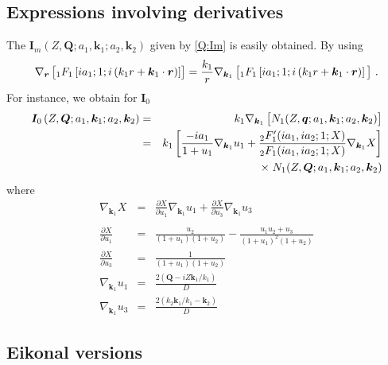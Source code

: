 \subsection{Expressions involving derivatives}
The $\bm{I}_{m} \left(Z, \bm{Q}; a_{1}, \bm{k}_{1} ; a_{2}, \bm{k}_{2}
\right) $ given by \ref{Q:Im} is easily obtained. By using
%
\[
\nabla_{\bm{r}} \left[\vstretch {_{1}F_{1}} \left[ i a_{1} ; 1 ;i
\left(k_{1} r + \bm{k}_{1}\cdot \bm{r} \right)\right] \right] =
\frac{k_{1}}{r} \nabla_{\bm{k}_{1}}\left[  {_{1}F_{1}} \left[ i
a_{1} ; 1 ;i \left(k_{1} r + \bm{k}_{1}\cdot \bm{r} \right)\right]
\vstretch\right] \, .
\]
%
For instance, we obtain for $\bm{I}_{0}$
%
\begin{eqnarray*}
\bm{I}_{0} \left(Z, \bm{Q}; a_{1}, \bm{k}_{1} ; a_{2}, \bm{k}_{2}
\right) &=& k_{1} \nabla_{\bm{k}_{1}} \left[ N_{1}(Z,\bm{q};
a_{1},\bm{k}_{1}; a_{2},\bm{k}_{2})  \vstretch \right]
\\
&=& k_{1}  \left[ \frac{-i a_{1}}{1 + u_{1}} \nabla_{\bm{k}_{1}}
u_{1}  + \frac{{_{2}F'_{1}}(i a_{1}, i a_{2}; 1;
X)}{{_{2}F_{1}}(i a_{1}, i a_{2}; 1; X)} \nabla_{\bm{k}_{1}} X
\right] \nonumber
\\
&& {\times} \; N_{1}(Z,\bm{Q}; a_{1},\bm{k}_{1}; a_{2},\bm{k}_{2})
\end{eqnarray*}
%
where
\begin{eqnarray*}
\nabla_{\bm{k}_{1}} X &=& \frac{\partial X}{\partial u_{1}}
\nabla_{\bm{k}_{1}} u_{1} + \frac{\partial X}{\partial u_{3}}
\nabla_{\bm{k}_{1}} u_{3}
 \\
\\
\frac{\partial X}{\partial u_{1}}  &=& \frac{u_{2}}{ ( 1 + u_{1}) (1 +
u_{2})} - \frac{u_{1} u_{2} + u_{3}}{(1 + u_{1})^{2} (1 + u_{2})}
\nonumber \\
\frac{\partial X}{\partial u_{3}}  &=& \frac{1}{ ( 1 + u_{1})
(1 + u_{2})} \nonumber \\
\nabla_{\bm{k}_{1}} u_{1} &=& \frac{2\left( \bm{Q} - i Z \bm{k}_{1}
/k_{1} \right)}{D}
\nonumber \\
\nabla_{\bm{k}_{1}} u_{3} &=& \frac{2 \left( k_{2} \bm{k}_{1}/k_{1} -
\bm{k}_{2} \right)}{D} \nonumber
\end{eqnarray*}

\subsection{Eikonal versions}


